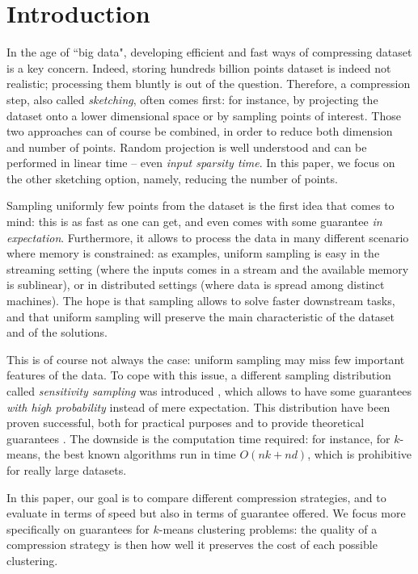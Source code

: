 \section{Introduction}

In the age of ``big data", developing efficient and fast ways of compressing dataset is a key concern. Indeed, storing hundreds billion points dataset is indeed not realistic; processing them bluntly is out of the question. 
Therefore, a compression step, also called \textit{sketching}, often comes first: for instance, by projecting the dataset onto a lower dimensional space or by sampling points of interest. Those two approaches can of course be combined, in order to reduce both dimension and number of points. 
Random projection is well understood and can be performed in linear time -- even \textit{input sparsity time}. 
In this paper, we focus on the other sketching option, namely, reducing the number of points.

Sampling uniformly few points from the dataset is the first idea that comes to mind: this is as fast as one can get, and even comes with some guarantee \emph{in expectation}. 
Furthermore, it allows to process the data in many different scenario where memory is constrained: as examples, uniform sampling is easy in the streaming setting (where the inputs comes in a stream and the available memory is sublinear), or in distributed settings (where data is spread among distinct machines).
The hope is that sampling allows to solve faster downstream tasks, and that uniform sampling will preserve the main characteristic of the dataset and of the solutions.

This is of course not always the case: uniform sampling may miss few important features of the data. 
To cope with this issue, a different sampling distribution called \textit{sensitivity sampling} was introduced \cite{LS10}, which allows to have some guarantees \textit{with high probability} instead of mere expectation.
This distribution have been proven successful, both for practical purposes \cite{} and to provide theoretical guarantees \cite{FeldmanL11, CohenP15}. 
The downside is the computation time required: for instance, for $k$-means, the best known algorithms run in time $O(nk+nd)$, which is prohibitive for really large datasets.

In this paper, our goal is to compare different compression strategies, and to evaluate in terms of speed but also in terms of guarantee offered. We focus more specifically on guarantees for $k$-means clustering problems: the quality of a compression strategy is then how well it preserves the cost of each possible clustering.


